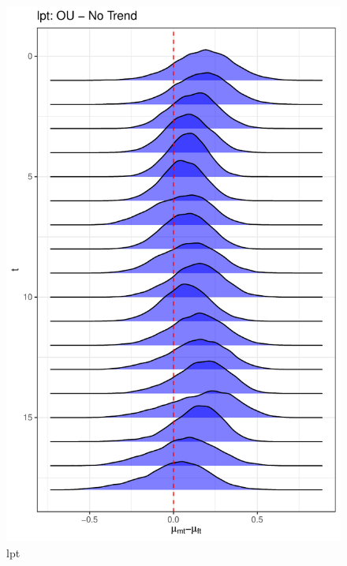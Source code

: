\documentclass[
  12pt,
]{article}
\begin{document}
\begin{figure}

{\centering \includegraphics[width=0.9\linewidth]{../Figures/lpt/mu_diff} 

}

\caption{lpt}\label{fig:unnamed-chunk-13}
\end{figure}
\end{document}

